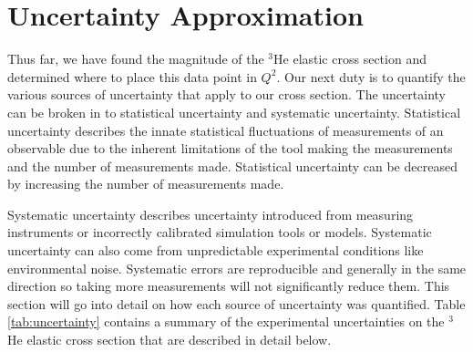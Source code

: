 \section{Uncertainty Approximation}
\label{sec:uncertainty}

Thus far, we have found the magnitude of the $^3$He elastic cross section and determined where to place this data point in $Q^2$. Our next duty is to quantify the various sources of uncertainty that apply to our cross section. The uncertainty can be broken in to statistical uncertainty and systematic uncertainty. Statistical uncertainty describes the innate statistical fluctuations of measurements of an observable due to the inherent limitations of the tool making the measurements and the number of measurements made. Statistical uncertainty can be decreased by increasing the number of measurements made. 

Systematic uncertainty describes uncertainty introduced from measuring instruments or incorrectly calibrated simulation tools or models. Systematic uncertainty can also come from unpredictable experimental conditions like environmental noise. Systematic errors are reproducible and generally in the same direction so taking more measurements will not significantly reduce them. This section will go into detail on how each source of uncertainty was quantified. Table \ref{tab:uncertainty} contains a summary of the experimental uncertainties on the $^3$He elastic cross section that are described in detail below.

\vspace{5mm}

